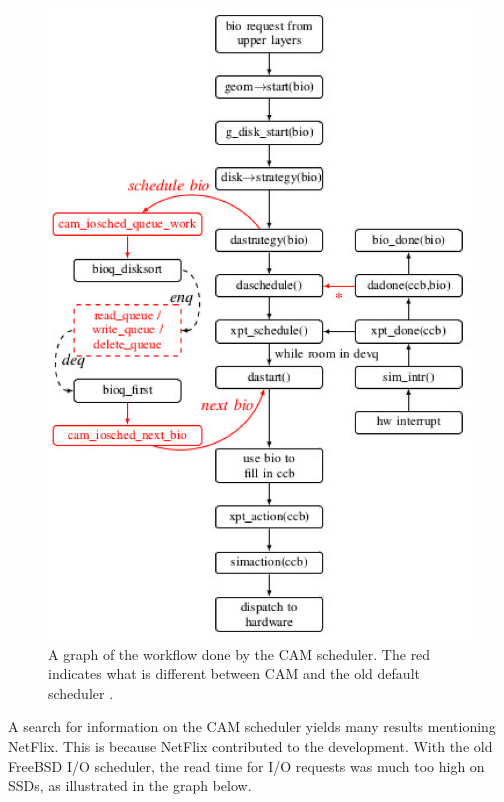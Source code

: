 \documentclass[10pt,draftclsnofoot,onecolumn,journal,compsoc]{IEEEtran}
\begin{document}
\begin{figure}[H]
\centering
    \includegraphics[scale=.7]{graph2.eps}
    \caption{A graph of the workflow done by the CAM scheduler. The red indicates what is different between CAM and the old default scheduler \cite{bsd2}.}
\end{figure}

A search for information on the CAM scheduler yields many results mentioning NetFlix. This is because NetFlix contributed to the development. With the old FreeBSD I/O scheduler, the read time for I/O requests was much too high on SSDs, as illustrated in the graph below. \\ \\
\end{document}
